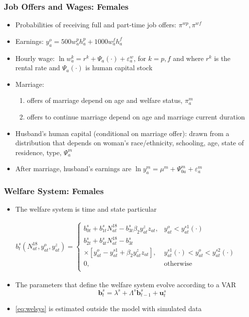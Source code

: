 \begin{frame}
	\frametitle{Job Offers and Wages: Females}
	\begin{itemize}
		\item Probabilities of receiving full and part-time job offers: $\pi^{wp}, \pi^{wf}$
		\item Earnings: $y_{a}^o = 500w_{a}^ph_{a}^p + 1000w_{a}^fh_{a}^f $
		\item Hourly wage: $\ln w_{a}^k = r^k + \Psi_{a}(\cdot) + \varepsilon_{a}^{w}$, for $k = p,f$ and where $r^k$ is the rental rate and $\Psi_{a}(\cdot)$ is human capital stock
		\item Marriage: 
			\begin{enumerate}
			\item offers of marriage depend on age and welfare status, $\pi_{a}^m$
			\item offers to continue marriage depend on age and marriage current duration
			\end{enumerate}
		\item Husband's human capital (conditional on marriage offer): drawn from a distribution that depends on woman's race/ethnicity, schooling, age, state of residence, type, $\Psi_{a}^m$
		\item After marriage, husband's earnings are $\ln y_{a}^m = \mu^m + \Psi_{0a}^m + \varepsilon_{a}^m$ 					
		\end{itemize}
\end{frame}

\begin{frame}
	\frametitle{Welfare System: Females}
	\begin{itemize}
		\item The welfare system is time and state particular
	\end{itemize}
	\begin{eqnarray}
b_{t}^s \left( N_{at}^{18}, y_{at}^o, y_{at}^z \right) =
\begin{cases}
b_{0t}^s + b_{1t}^s N_{at}^{18} - b_{3t}^s \beta_{2} y_{at}^z z_{at}, & y_{at}^o < y_{at}^{s1}(\cdot) \nonumber \\
b_{2t}^s + b_{4t}^s N_{at}^{18} - b_{3t}^s & \nonumber \\
\times \left[ y_{at}^o - y_{at}^{s1} + \beta_{2} y_{at}^z z_{at} \right] , & y_{at}^{s1}(\cdot) < y_{at}^o < y_{at}^{s2}(\cdot) \nonumber \\
0, & \text{otherwise} \nonumber \\
\end{cases}
	\end{eqnarray}
	\begin{itemize}
	\item The parameters that define the welfare system evolve according to a VAR
		\begin{equation}
		\mathbf{b}_{t}^s = \lambda^s + \Lambda^s \mathbf{b}_{t-1}^s + \mathbf{u}_{t}^s \label{eq:welsys}
		\end{equation}
	 \item \eqref{eq:welsys} is estimated outside the model with simulated data
	\end{itemize}
\end{frame}


